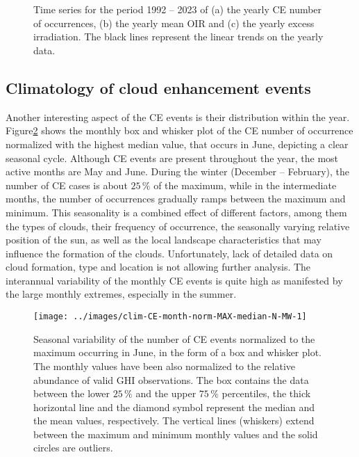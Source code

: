 \documentclass[preprint, 5p,
authoryear]{elsarticle} %
\begin{document}
\begin{figure}%
        {\centering 
            \\
            \\
        }
    \caption{Time series for the period 1992 -- 2023 of (a) the yearly CE number of occurrences, (b) the yearly mean OIR and (c) the yearly excess irradiation. The black lines represent the linear trends on the yearly data.}\label{fig:P-energy}
\end{figure}

\subsection{Climatology of cloud enhancement
events}\label{climatology-of-cloud-enhancement-events}

Another interesting aspect of the CE events is their distribution within
the year. Figure\nobreakspace{}\ref{fig:relative-month-occurrences}
shows the monthly box and whisker plot of the CE number of occurrence
normalized with the highest median value, that occurs in June, depicting
a clear seasonal cycle. Although CE events are present throughout the
year, the most active months are May and June. During the winter
(December -- February), the number of CE cases is about \(25\,\%\) of
the maximum, while in the intermediate months, the number of occurrences
gradually ramps between the maximum and minimum. This seasonality is a
combined effect of different factors, among them the types of clouds,
their frequency of occurrence, the seasonally varying relative position
of the sun, as well as the local landscape characteristics that may
influence the formation of the clouds. Unfortunately, lack of detailed
data on cloud formation, type and location is not allowing further
analysis. The interannual variability of the monthly CE events is quite
high as manifested by the large monthly extremes, especially in the
summer.

\begin{figure}

{\centering \texttt{[image: ../images/clim-CE-month-norm-MAX-median-N-MW-1]} 

}

\caption{Seasonal variability of the number of CE events normalized to the maximum occurring in June, in the form of a box and whisker plot. The monthly values have been also normalized to the relative abundance of valid GHI observations. The box contains the data between the lower $25\,\%$ and the upper $75\,\%$ percentiles, the thick horizontal line and the diamond symbol represent the median and the mean values, respectively. The vertical lines (whiskers) extend between the maximum and minimum monthly values and the solid circles are outliers.}\label{fig:relative-month-occurrences}
\end{figure}
\end{document}
